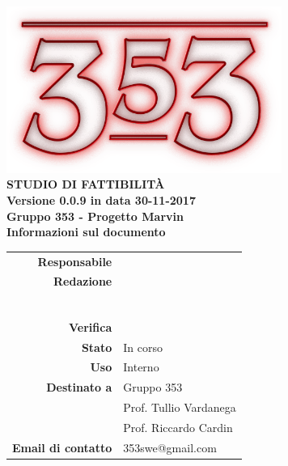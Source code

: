 \documentclass[openany, a4paper, 12pt]{report}
\begin{document}
\begin{titlepage}
	\centering
	\vfill
	{
		\bfseries
		\vskip2cm
		\includegraphics[width=9cm]{../../common/images/logo.png} \\
		\vfill
		\Huge{STUDIO DI FATTIBILITÀ}\\
		\vfill
		\Large Versione 0.0.9 in data 30-11-2017\\
		\large Gruppo 353 - Progetto Marvin\\
		\vfill
	\normalsize Informazioni sul documento\\
\begin{table}[htbp]
	\centering
	\renewcommand\arraystretch{1.2}
	\begin{tabular}{r|l}
		\hline
		\textbf{Responsabile}	& \\
		
		\textbf{Redazione} 		& \Davide\\
								& \Elena\\
								& \Gianluca\\
								& \Mirco\\
								& \Parwinder\\
								& \Riccardo\\
								& \Valentina\\
								
		\textbf{Verifica} 		& \\		
							
		\textbf{Stato} 			& In corso\\
		
		\textbf{Uso}			& Interno\\
		
		\textbf{Destinato a}   	& Gruppo 353\\
								& Prof. Tullio Vardanega\\
								& Prof. Riccardo Cardin\\
		
		\textbf{Email di contatto}	& 353swe@gmail.com
	\end{tabular}
\end{table}
		\vfill
	}    
\end{titlepage}

\tableofcontents
\newpage
{}









 
\end{document}
